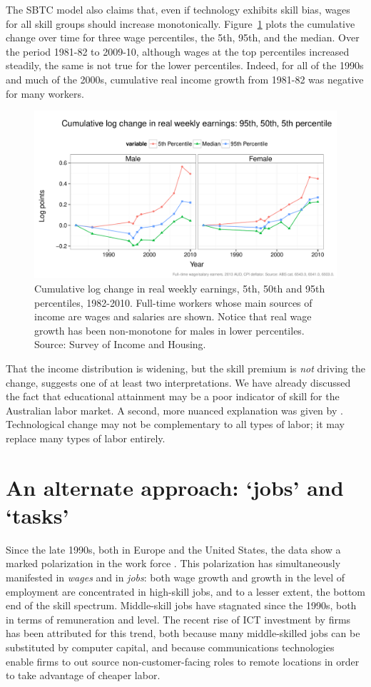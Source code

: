 \documentclass[a4paper,11pt,notitlepage]{article}
\begin{document}
The SBTC model also claims that, even if technology exhibits skill bias, wages for all skill groups should increase monotonically. Figure~\ref{fig:changetime} plots the cumulative change over time for three wage percentiles, the 5th, 95th, and the median. Over the period 1981-82 to 2009-10, although wages at the top percentiles increased steadily, the same is not true for the lower percentiles. Indeed, for all of the 1990s and much of the 2000s, cumulative real income growth from 1981-82 was negative for many workers.
\begin{figure}
  \centering
  \includegraphics[width=\textwidth]{../figure/wage_change_time.pdf}
  \caption{Cumulative log change in real weekly earnings, 5th, 50th and 95th percentiles, 1982-2010. Full-time workers whose main sources of income are wages and salaries are shown. Notice that real wage growth has been non-monotone for males in lower percentiles. Source: Survey of Income and Housing.}
  \label{fig:changetime}
\end{figure}

That the income distribution is widening, but the skill premium is {\em not} driving the change, suggests one of at least two interpretations. We have already discussed the fact that educational attainment may be a poor indicator of skill for the Australian labor market. A second, more nuanced explanation was given by \citet{Levy2003}. Technological change may not be complementary to all types of labor; it may replace many types of labor entirely.

\section{An alternate approach: `jobs' and `tasks'}

Since the late 1990s, both in Europe and the United States, the data show a marked polarization in the work force \citep{Goos2007, Autor2006}. This polarization has simultaneously manifested in \emph{wages} and in \emph{jobs}: both wage growth and growth in the level of employment are concentrated in high-skill jobs, and to a lesser extent, the bottom end of the skill spectrum. Middle-skill jobs have stagnated since the 1990s, both in terms of remuneration and level. The recent rise of ICT investment by firms has been attributed for this trend, both because many middle-skilled jobs can be substituted by computer capital, and because communications technologies enable firms to out source non-customer-facing roles to remote locations in order to take advantage of cheaper labor.
\end{document}
